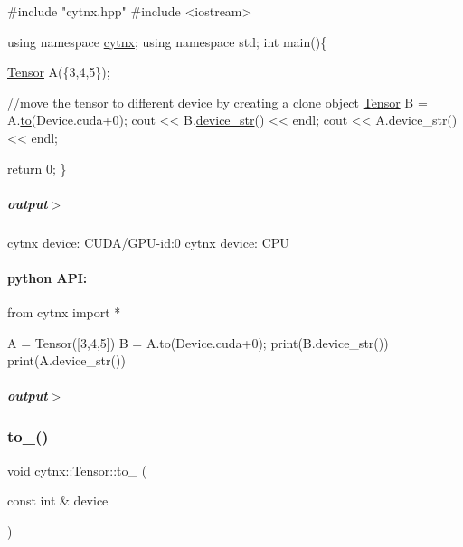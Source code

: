 \begin{DoxyCodeInclude}
\textcolor{preprocessor}{#include "cytnx.hpp"}
\textcolor{preprocessor}{#include <iostream>}


\textcolor{keyword}{using namespace }\hyperlink{namespacecytnx}{cytnx};
\textcolor{keyword}{using namespace }std;
\textcolor{keywordtype}{int} main()\{

    \hyperlink{classcytnx_1_1Tensor}{Tensor} A(\{3,4,5\});

    \textcolor{comment}{//move the tensor to different device by creating a clone object}
    \hyperlink{classcytnx_1_1Tensor}{Tensor} B = A.\hyperlink{classcytnx_1_1Tensor_acf7f697a9434f9bc98a7d00a555ee982}{to}(Device.cuda+0);
    cout << B.\hyperlink{classcytnx_1_1Tensor_a335f7625fa01784f49b2223238d0c14e}{device\_str}() << endl;
    cout << A.device\_str() << endl;    


    \textcolor{keywordflow}{return} 0;
\}
\end{DoxyCodeInclude}
 \subparagraph*{output$>$}


\begin{DoxyVerbInclude}
cytnx device: CUDA/GPU-id:0
cytnx device: CPU
\end{DoxyVerbInclude}
 \paragraph*{python A\+PI\+:}


\begin{DoxyCodeInclude}
\textcolor{keyword}{from} cytnx \textcolor{keyword}{import} *

A = Tensor([3,4,5])
B = A.to(Device.cuda+0);
print(B.device\_str())
print(A.device\_str())


\end{DoxyCodeInclude}
 \subparagraph*{output$>$}


\begin{DoxyVerbInclude}
\end{DoxyVerbInclude}
 \mbox{\label{classcytnx_1_1Tensor_a114a31fbb8bf4a90f150b6a67e42183a}} 
\subsubsection{\texorpdfstring{to\+\_\+()}{to\_()}}
{\footnotesize\ttfamily void cytnx\+::\+Tensor\+::to\+\_\+ (\begin{DoxyParamCaption}\item[{const int \&}]{device }\end{DoxyParamCaption})\hspace{0.3cm}{\ttfamily [inline]}}



